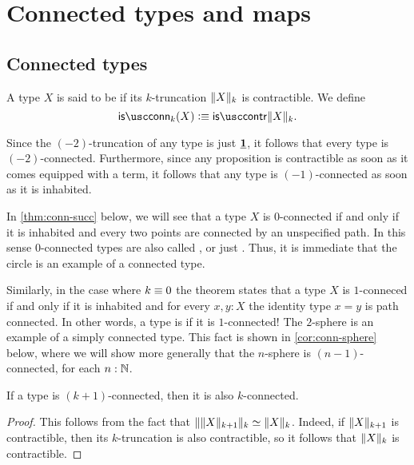 
\section{Connected types and maps}

\subsection{Connected types}

\begin{defn}
  A type $X$ is said to be  if its $k$-truncation $\trunc{k}{X}$ is contractible. We define
  \begin{equation*}
    \isconn_k(X)\defeq\iscontr\trunc{k}{X}.
  \end{equation*}
\end{defn}

\begin{rmk}
  Since the $(-2)$-truncation of any type is just $\unit$, it follows that every type is $(-2)$-connected. Furthermore, since any proposition is contractible as soon as it comes equipped with a term, it follows that any type is $(-1)$-connected as soon as it is inhabited.

    In \cref{thm:conn-succ} below, we will see that a type $X$ is $0$-connected if and only if it is inhabited and every two points are connected by an unspecified path. In this sense $0$-connected types are also called , or just . Thus, it is immediate that the circle is an example of a connected type.

  Similarly, in the case where $k\jdeq 0$ the theorem states that a type $X$ is $1$-conneced if and only if it is inhabited and for every $x,y:X$ the identity type $x=y$ is path connected. In other words, a type is  if it is $1$-connected! The $2$-sphere is an example of a simply connected type. This fact is shown in \cref{cor:conn-sphere} below, where we will show more generally that the $n$-sphere is $(n-1)$-connected, for each $n:\N$.
\end{rmk}

\begin{lem}
  If a type is $(k+1)$-connected, then it is also $k$-connected.
\end{lem}

\begin{proof}
  This follows from the fact that $\trunc{k}{\trunc{k+1}{X}}\simeq\trunc{k}{X}$. Indeed, if $\trunc{k+1}{X}$ is contractible, then its $k$-truncation is also contractible, so it follows that $\trunc{k}{X}$ is contractible.
\end{proof}

